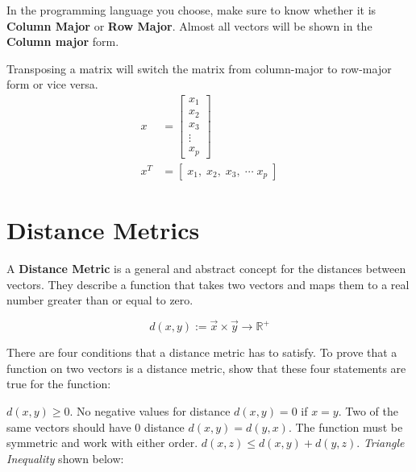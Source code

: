 In the programming language you choose, make sure to know whether it is \textbf{Column Major} or \textbf{Row Major}. Almost all vectors will be shown in the \textbf{Column major} form.


Transposing a matrix will switch the matrix from column-major to row-major form or vice versa.
  \begin{align*}
    x &= \begin{bmatrix}
           x_{1} \\
           x_{2} \\
            x_{3} \\
           \vdots \\
           x_{p}
         \end{bmatrix} \\
    x^T &= [\; x_1, \; x_2, \; x_3, \; \cdots \; x_p \;]
  \end{align*}



\section{Distance Metrics}
A \textbf{Distance Metric} is a general and abstract concept for the distances between vectors. They describe a function that takes two vectors and maps them to a real number greater than or equal to zero. 

\[
    d(x,y):= \vec{x} \times \vec{y} \rightarrow \mathbb{R}^+
\]

There are four conditions that a distance metric has to satisfy. To prove that a function on two vectors is a distance metric, show that these four statements are true for the function:

\begin{outline}
    \1 $d(x, y) \ge 0$. \; No negative values for distance
    \1 $d(x,y) = 0$ if $x = y$. \; Two of the same vectors should have 0 distance
    \1 $d(x,y) = d(y,x)$. \; The function must be symmetric and work with either order.
    \1 $d(x,z) \le d(x,y) + d(y,z)$. \; \textit{Triangle Inequality} shown below:
\end{outline}

\begin{center}
\end{center}

